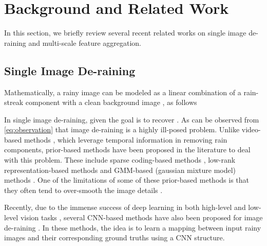 \documentclass[10pt,twocolumn,letterpaper]{article}
\begin{document}
\section{Background and Related Work}\label{sec:related}
In this section, we briefly review several recent related
works on single image de-raining and multi-scale feature aggregation.  

\subsection{Single Image De-raining}
Mathematically, a rainy image  can be modeled as  a linear combination of a rain-streak component  with a clean background image , as follows

In single image de-raining, given  the goal is to recover .   As can be observed from \eqref{eq:observation} that image de-raining is a highly ill-posed problem. Unlike video-based methods \cite{derain_cvpr17_video,derain_iccv17_video,derain_video_ijcv}, which leverage temporal information in removing rain components,  prior-based methods have been proposed in the literature to deal with this problem.  These include sparse coding-based methods \cite{derain_tip12,derain_tip14, derain_iccv17}, low-rank representation-based methods \cite{derain_lowrank,derain_csc_17} and GMM-based (gaussian mixture model) methods \cite{rain_2016_gmm}.  One of the limitations of some of these prior-based methods is that they often tend to over-smooth the image details \cite{derain_tip12,derain_csc_17}.   



Recently, due to the immense success of deep learning in both high-level and low-level vision tasks \cite{deep_residue,tao_stackgan_cvpr2018, zizhao_mdnet,peng_iccv17, jia_differ, style_hang},  several CNN-based methods have also been proposed for image de-raining \cite{cnn_derain2,derain_tip17,derain_cvpr2017_multi,derain_cvpr2017}.   In these methods, the idea is to learn a mapping  between input rainy images and their corresponding ground
truths using a CNN structure.  
\end{document}
